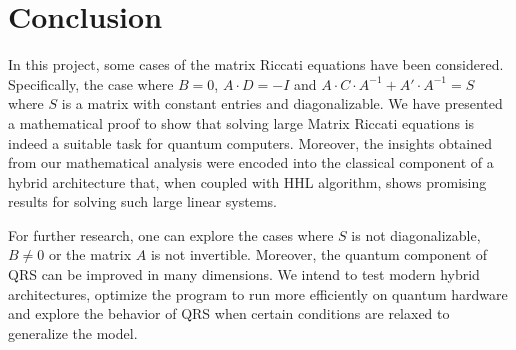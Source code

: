 \chapter*{Conclusion}
In this project, some cases of the matrix Riccati equations have been considered. Specifically, the case where $B = 0$, $A \cdot D = -I$ and $A \cdot C \cdot A^{-1} + A' \cdot A^{-1} = S$ where $S$ is a matrix with constant entries and diagonalizable. We have presented a mathematical proof to show that solving large Matrix Riccati equations is indeed a suitable task for quantum computers. Moreover, the insights obtained from our mathematical analysis were encoded into the classical component of a hybrid architecture that, when coupled with HHL algorithm, shows promising results for solving such large linear systems. 

For further research, one can explore the cases where $S$ is not diagonalizable, $B \neq 0$ or the matrix $A$ is not invertible. Moreover, the quantum component of QRS can be improved in many dimensions. We intend to test modern hybrid architectures, optimize the program to run more efficiently on quantum hardware and explore the behavior of QRS when certain conditions are relaxed to generalize the model.
